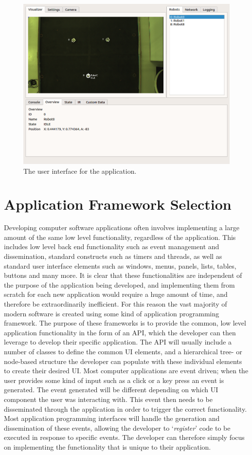 \begin{figure}
	\centering
	\includegraphics[scale=0.4]{Figures/ApplicationScreenshotOverview.png}
	\decoRule
	\caption[Application User Interface]{The user interface for the application.}
	\label{fig:UI}
\end{figure}

\section{Application Framework Selection}
Developing computer software applications often involves implementing a large amount of the same low level functionality, regardless of the application. This includes low level back end functionality such as event management and dissemination, standard constructs such as timers and threads, as well as standard user interface elements such as windows, menus, panels, lists, tables, buttons and many more. It is clear that these functionalities are independent of the purpose of the application being developed, and implementing them from scratch for each new application would require a huge amount of time, and therefore be extraordinarily inefficient. For this reason the vast majority of modern software is created using some kind of application programming framework. The purpose of these frameworks is to provide the common, low level application functionality in the form of an API, which the developer can then leverage to develop their specific application. The API will usually include a number of classes to define the common UI elements, and a hierarchical tree- or node-based structure the developer can populate with these individual elements to create their desired UI. Most computer applications are event driven; when the user provides some kind of input such as a click or a key press an event is generated. The event generated will be different depending on which UI component the user was interacting with. This event then needs to be disseminated through the application in order to trigger the correct functionality. Most application programming interfaces will handle the generation and dissemination of these events, allowing the developer to `\textit{register}' code to be executed in response to specific events. The developer can therefore simply focus on implementing the functionality that is unique to their application.

